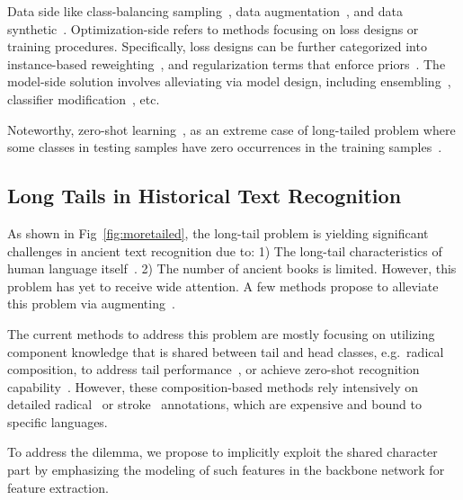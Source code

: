 Data side like class-balancing sampling~\cite{upsam}, data augmentation~\cite{cutmix}, and data synthetic~\cite{smote,hzsl}. 
Optimization-side refers to methods focusing on loss designs or training procedures. Specifically, loss designs can be further categorized into instance-based reweighting~\cite{focal,otem}, and regularization terms that enforce priors~\cite{fudanvi,sanicdar23,logvar}.
The model-side solution involves alleviating via model design, including ensembling~\cite{fle,flmoe}, classifier modification~\cite{normrob}, etc.

Noteworthy, zero-shot learning~\cite{gzsl-survey}, as an extreme case of long-tailed problem where some classes in testing samples have zero occurrences in the training samples~\cite{olt}.

\subsection{Long Tails in Historical Text Recognition}

As shown in Fig~\ref{fig:moretailed}, the long-tail problem is yielding significant challenges in ancient text recognition due to: 1) The long-tail characteristics of human language itself~\cite{yang2022survey}. 2) The number of ancient books is limited. However, this problem has yet to receive wide attention. A few methods propose to alleviate this problem via augmenting~\cite{aaoracle,atlt}.

The current methods to address this problem are mostly focusing on utilizing component knowledge that is shared between tail and head classes, e.g.\ radical composition, to address tail performance~\cite{obcmk2,sanicdar23,fudanvi}, or achieve zero-shot recognition capability~\cite{jinic21,gold,9412607,DBLP:conf/icfhr/ChandaBHHSS18,wubizhengma}. However, these composition-based methods rely intensively on detailed radical~\cite{fewran} or stroke~\cite{taktak} annotations, which are expensive and bound to specific languages.

To address the dilemma, we propose to implicitly exploit the shared character part by emphasizing the modeling of such features in the backbone network for feature extraction.

